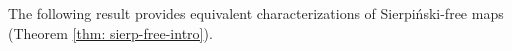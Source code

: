 \documentclass{amsart}
\theoremstyle{plain}
\newtheorem{theorem}{Theorem}[section]
\theoremstyle{definition}
\theoremstyle{remark}
\renewcommand{\phi}{\varphi}
\newcommand{\reminder}[1]{\textsl{$\lhd\rhd$#1$\lhd\rhd$}\marginpar{$\lhd\rhd\lhd\rhd\lhd\rhd$}}%
\newcommand{\hide}[1]{}
\newcommand{\CC}{{\mathcal C}}
\newcommand{\cro}{{\operatorname{dec}}}
\begin{document}
%
%
%
%


The following result provides equivalent characterizations of Sierpi\'{n}ski-free maps (Theorem \ref{thm: sierp-free-intro}).


\end{document}
